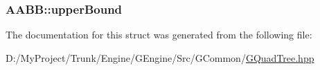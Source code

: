 \subsubsection[{upper\+Bound}]{ A\+A\+B\+B\+::upper\+Bound}\label{struct_a_a_b_b_a8f024de08dcd1c1f1e1adc8af3fbb864}


The documentation for this struct was generated from the following file\+:\begin{DoxyCompactItemize}
\item 
D\+:/\+My\+Project/\+Trunk/\+Engine/\+G\+Engine/\+Src/\+G\+Common/\hyperlink{_g_quad_tree_8hpp}{G\+Quad\+Tree.\+hpp}\end{DoxyCompactItemize}
